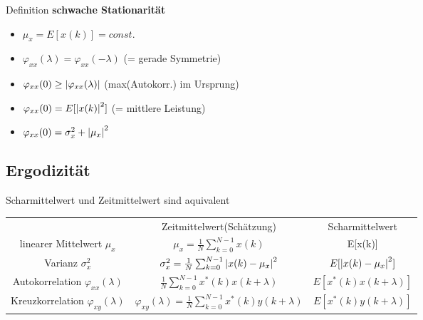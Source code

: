 \documentclass[10pt,a4paper]{article}
\begin{document}
Definition \textbf{schwache Stationarität}
\begin{itemize}
    \item $\mu_x = E[x(k)] = const.$
    \item $\varphi_{xx}(\lambda) = \varphi_{xx}(-\lambda)$ (= gerade Symmetrie)
    \item $\varphi_{xx}(0) \geq \abs{\varphi_{xx}(\lambda)}$ (max(Autokorr.) im Ursprung)
    \item $\varphi_{xx}(0) =E[\abs{x(k)}^2]$ (= mittlere Leistung)
    \item $\varphi_{xx}(0) = \sigma_x^2 + \abs{\mu_x}^2$
\end{itemize}
\subsection{Ergodizität}
Scharmittelwert und Zeitmittelwert sind aquivalent\\
    \begin{center}
    \begin{tabular}{|c|c|c|}
\cline{1-3}
        & Zeitmittelwert(Schätzung) & Scharmittelwert \\
\cline{1-3}
        linearer Mittelwert $\mu_x$ & $\mu_x = \frac{1}{N}\sum_{k=0}^{N-1}x(k)$ & E[x(k)] \\
\cline{1-3}
        Varianz $\sigma_x^2$ & $\sigma_x^2 = \frac{1}{N}\sum_{k=0}^{N-1}\abs{x(k)-\mu_x}^2$ & $E[\abs{x(k)-\mu_x}^2]$ \\
\cline{1-3}
        Autokorrelation $\varphi_{xx}(\lambda)$ & $\frac{1}{N}\sum_{k=0}^{N-1} x^*(k)x(k+\lambda) $ & $E[x^*(k)x(k+\lambda)]$ \\
\cline{1-3}
        Kreuzkorrelation $\varphi_{xy}(\lambda)$ & $\varphi_{xy}(\lambda)=\frac{1}{N}\sum_{k=0}^{N-1} x^*(k)y(k+\lambda) $ & $E[x^*(k)y(k+\lambda)]$ \\
\cline{1-3}
    \end{tabular}
    \end{center}
\end{document}

